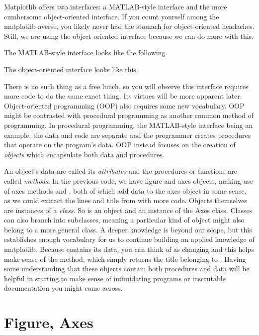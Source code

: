 Matplotlib offers two interfaces: a MATLAB-style interface and the more cumbersome object-oriented interface. If you count yourself among the matplotlib-averse, you likely never had the stomach for object-oriented headaches. Still, we are using the object oriented interface because we can do more with this.

The MATLAB-style interface looks like the following. 


The object-oriented interface looks like this. 



There is no such thing as a free lunch, so you will observe this interface requires more code to do the same exact thing. Its virtues will be more apparent later. Object-oriented programming (OOP) also requires some new vocabulary. OOP might be contrasted with procedural programming as another common method of programming. In procedural programming, the MATLAB-style interface being an example, the data and code are separate and the programmer creates procedures that operate on the program's data. OOP instead focuses on the creation of \emph{objects} which encapsulate both data and procedures. 

An object's data are called its \emph{attributes} and the procedures or functions are called \emph{methods}. In the previous code, we have figure and axes objects, making use of axes methods  and , both of which add data to the axes object in some sense, as we could extract the lines and title from  with more code. Objects themselves are instances of a \emph{class}. So  is an object and an instance of the Axes class. Classes can also branch into subclasses, meaning a particular kind of object might also belong to a more general class. A deeper knowledge is beyond our scope, but this establishes enough vocabulary for us to continue building an applied knowledge of matplotlib. Because  contains its data, you can think of  as changing  and this helps make sense of the  method, which simply returns the title belonging to . Having some understanding that these objects contain both procedures and data will be helpful in starting to make sense of intimidating programs or inscrutable documentation you might come across.  %

\section{Figure, Axes}

